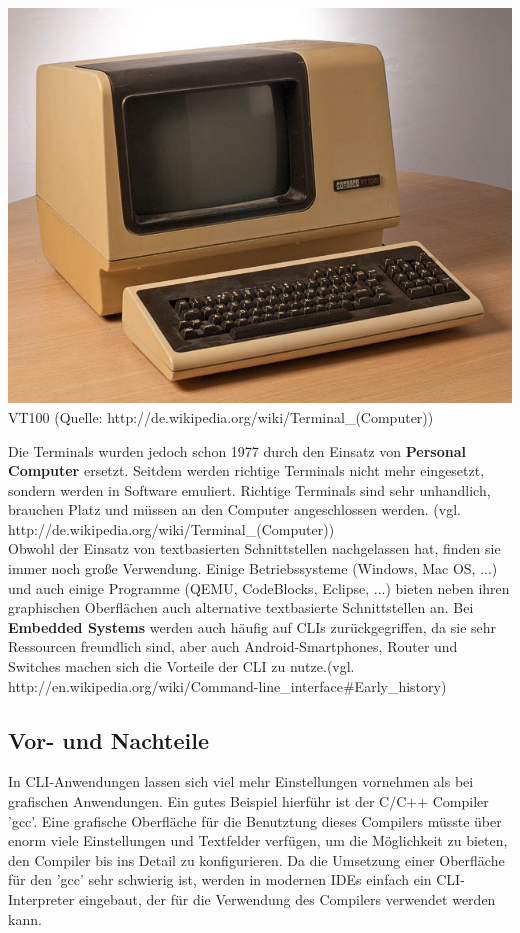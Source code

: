 \documentclass[12pt,a4paper]{report}
\begin{document}
\begin{center}
\includegraphics[scale=2.0]{img/vt100.jpg}\\
VT100 (Quelle: http://de.wikipedia.org/wiki/Terminal\_(Computer))
\end{center}

Die Terminals wurden jedoch schon 1977 durch den Einsatz von \textbf{Personal Computer} ersetzt. Seitdem werden richtige Terminals nicht mehr eingesetzt, sondern werden in Software emuliert. Richtige Terminals sind sehr unhandlich, brauchen Platz und müssen an den Computer angeschlossen werden. (vgl. http://de.wikipedia.org/wiki/Terminal\_(Computer))\\

Obwohl der Einsatz von textbasierten Schnittstellen nachgelassen hat, finden sie immer noch große Verwendung. Einige Betriebssysteme (Windows, Mac OS, ...) und auch einige Programme (QEMU, CodeBlocks, Eclipse, ...) bieten neben ihren graphischen Oberflächen auch alternative textbasierte Schnittstellen an. Bei \textbf{Embedded Systems} werden auch häufig auf CLIs zurückgegriffen, da sie sehr Ressourcen freundlich sind, aber auch Android-Smartphones, Router und Switches machen sich die Vorteile der CLI zu nutze.(vgl. http://en.wikipedia.org/wiki/Command-line\_interface\#Early\_history)

\subsection{Vor- und Nachteile}

In CLI-Anwendungen lassen sich viel mehr Einstellungen vornehmen als bei grafischen Anwendungen. Ein gutes Beispiel hierführ ist der C/C++ Compiler 'gcc'. Eine grafische Oberfläche für die Benutztung dieses Compilers müsste über enorm viele Einstellungen und Textfelder verfügen, um die Möglichkeit zu bieten, den Compiler bis ins Detail zu konfigurieren. Da die Umsetzung einer Oberfläche für den 'gcc' sehr schwierig ist, werden in modernen IDEs einfach ein CLI-Interpreter eingebaut, der für die Verwendung des Compilers verwendet werden kann.\\
\end{document}

